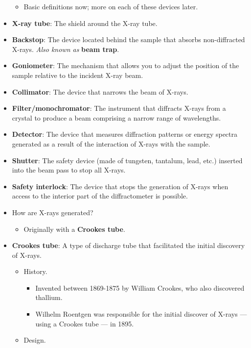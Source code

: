 \documentclass[../notes.tex]{subfiles}
\begin{document}
\begin{itemize}
\begin{itemize}
        \item Basic definitions now; more on each of these devices later.
    \end{itemize}
    \item \textbf{X-ray tube}: The shield around the X-ray tube.
    \item \textbf{Backstop}: The device located behind the sample that absorbs non-diffracted X-rays. \emph{Also known as} \textbf{beam trap}.
    \item \textbf{Goniometer}: The mechanism that allows you to adjust the position of the sample relative to the incident X-ray beam.
    \item \textbf{Collimator}: The device that narrows the beam of X-rays.
    \item \textbf{Filter/monochromator}: The instrument that diffracts X-rays from a crystal to produce a beam comprising a narrow range of wavelengths.
    \item \textbf{Detector}: The device that measures diffraction patterns or energy spectra generated as a result of the interaction of X-rays with the sample.
    \item \textbf{Shutter}: The safety device (made of tungsten, tantalum, lead, etc.) inserted into the beam pass to stop all X-rays.
    \item \textbf{Safety interlock}: The device that stops the generation of X-rays when access to the interior part of the diffractometer is possible.
    \item How are X-rays generated?
    \begin{itemize}
        \item Originally with a \textbf{Crookes tube}.
    \end{itemize}
    \item \textbf{Crookes tube}: A type of discharge tube that facilitated the initial discovery of X-rays.
    \begin{itemize}
        \item History.
        \begin{itemize}
            \item Invented between 1869-1875 by William Crookes, who also discovered thallium.
            \item Wilhelm Roentgen was responsible for the initial discover of X-rays --- using a Crookes tube --- in 1895.
        \end{itemize}
        \item Design.
        \begin{itemize}

\end{itemize}
\end{itemize}
\end{itemize}
\end{document}
